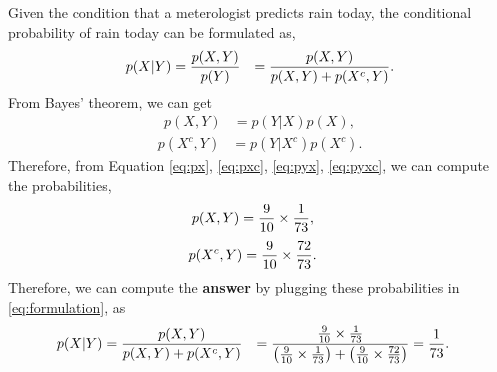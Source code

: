 \documentclass[journal,onecolumn,12pt]{IEEEtran}
\begin{document}
Given the condition that a meterologist predicts rain today, the conditional probability of rain today can be formulated as,
\begin{equation}
\begin{aligned}
p(X|Y)&={{p(X, Y)}\over{p(Y)}}
&= {{p(X, Y)}\over{p(X,Y)+p({X^c},Y)}}.
\end{aligned}
\label{eq:formulation}
\end{equation}
From Bayes' theorem, we can get 
\begin{equation}
\begin{aligned}
p(X, Y)&={{p(Y|X)}{p(X)}},
\end{aligned}
\end{equation}
\begin{equation}
\begin{aligned}
p(X^c, Y)&={{p(Y|X^c)}{p(X^c)}}.
\end{aligned}
\end{equation}
Therefore, from Equation \ref{eq:px}, \ref{eq:pxc}, \ref{eq:pyx}, \ref{eq:pyxc}, we can compute the probabilities,
\begin{equation}
\begin{aligned}
p(X, Y)&={{9}\over{10}}\times{{1}\over{73}},
\end{aligned}
\end{equation}
\begin{equation}
\begin{aligned}
p(X^c, Y)&={{9}\over{10}}\times{{72}\over{73}}.
\end{aligned}
\end{equation}
Therefore, we can compute the {\bf answer} by plugging these probabilities in \ref{eq:formulation}, as
\begin{equation}
\begin{aligned}
p(X|Y)&= {{p(X, Y)}\over{p(X,Y)+p({X^c},Y)}}
&= {{{{9}\over{10}}\times{{1}\over{73}}}\over{\left({{{9}\over{10}}\times{{1}\over{73}}}\right)+\left({{{9}\over{10}}\times{{72}\over{73}}}\right)}}
&= {{1}\over{73}}.
\end{aligned}
\end{equation}

\pagebreak
\end{document}
